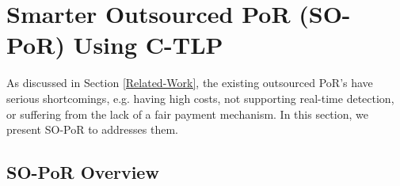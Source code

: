 

\vspace{-8mm}

\section{Smarter Outsourced PoR (SO-PoR) Using C-TLP}
 As discussed in Section \ref{Related-Work}, the existing outsourced PoR's  have serious shortcomings, e.g. having high costs, not supporting real-time detection, or suffering from the lack of a fair payment mechanism. In this section, we present SO-PoR to addresses them. 
 
 

 \vspace{-3mm}
 
\subsection{SO-PoR Overview} 

 \vspace{-2.2mm}
 

